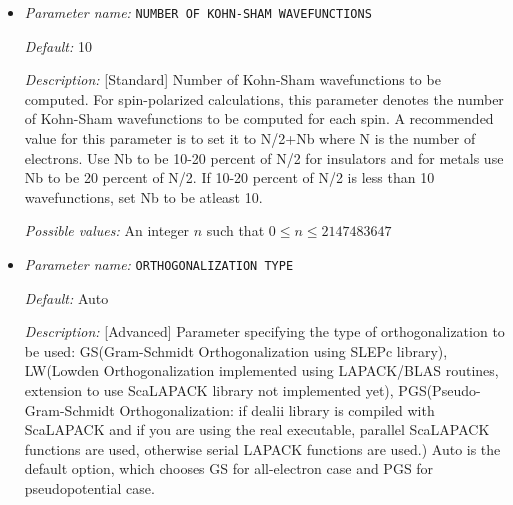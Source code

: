 \begin{itemize}


{\it Default:} -10.0


{\it Description:} [Developer] The lower bound of the wanted eigen spectrum. It is only used for the first iteration of the Chebyshev filtered subspace iteration procedure. A rough estimate based on single atom eigen values can be used here. Default value is good enough for most problems.


{\it Possible values:} A floating point number $v$ such that $-\text{MAX\_DOUBLE} \leq v \leq \text{MAX\_DOUBLE}$
\item {\it Parameter name:} {\tt NUMBER OF KOHN-SHAM WAVEFUNCTIONS}
\label{parameters:SCF parameters/Eigen_2dsolver parameters/NUMBER OF KOHN_2dSHAM WAVEFUNCTIONS}
\label{parameters:SCF_20parameters/Eigen_2dsolver_20parameters/NUMBER_20OF_20KOHN_2dSHAM_20WAVEFUNCTIONS}




{\it Default:} 10


{\it Description:} [Standard] Number of Kohn-Sham wavefunctions to be computed. For spin-polarized calculations, this parameter denotes the number of Kohn-Sham wavefunctions to be computed for each spin. A recommended value for this parameter is to set it to N/2+Nb where N is the number of electrons. Use Nb to be 10-20 percent of N/2 for insulators and for metals use Nb to be 20 percent of N/2. If 10-20 percent of N/2 is less than 10 wavefunctions, set Nb to be atleast 10.


{\it Possible values:} An integer $n$ such that $0\leq n \leq 2147483647$
\item {\it Parameter name:} {\tt ORTHOGONALIZATION TYPE}
\label{parameters:SCF parameters/Eigen_2dsolver parameters/ORTHOGONALIZATION TYPE}
\label{parameters:SCF_20parameters/Eigen_2dsolver_20parameters/ORTHOGONALIZATION_20TYPE}




{\it Default:} Auto


{\it Description:} [Advanced] Parameter specifying the type of orthogonalization to be used: GS(Gram-Schmidt Orthogonalization using SLEPc library), LW(Lowden Orthogonalization implemented using LAPACK/BLAS routines, extension to use ScaLAPACK library not implemented yet), PGS(Pseudo-Gram-Schmidt Orthogonalization: if dealii library is compiled with ScaLAPACK and if you are using the real executable, parallel ScaLAPACK functions are used, otherwise serial LAPACK functions are used.) Auto is the default option, which chooses GS for all-electron case and PGS for pseudopotential case.



\end{itemize}
